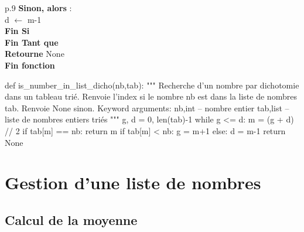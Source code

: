 \documentclass[10pt]{article}
\begin{document}
\begin{minipage}[c]{.48\linewidth}
\begin{pseudo}
\begin{center}
\begin{tabular}{p{.9\textwidth}}
\hspace{1.2cm}\textbf{Sinon, alors} :\\
\hspace{1.6cm}\textsf{d} $\leftarrow$ \textsf{m-1}\\
\hspace{.8cm} \textbf{Fin Si} \\
\hspace{.4cm}\textbf{Fin Tant que} \\
\hspace{.4cm}\textbf{Retourne} \textsf{None} \\
\textbf{Fin fonction} \\
\hline
\end{tabular}
\end{center}
\end{pseudo}
\end{minipage} \hfill
\begin{minipage}[c]{.48\linewidth}
\begin{py}
\begin{python}
def is_number_in_list_dicho(nb,tab):
    """ 
    Recherche d'un nombre par dichotomie dans un 
    tableau trié. 
    Renvoie l'index si le nombre nb est dans la liste 
    de nombres tab.
    Renvoie None sinon.
    Keyword arguments:
    nb,int -- nombre entier
    tab,list -- liste de nombres entiers triés
    """
    g, d = 0, len(tab)-1
    while g <= d:
        m = (g + d) // 2
        if tab[m] == nb:
            return m
        if tab[m] < nb:
            g = m+1
        else:
            d = m-1
    return None
\end{python}
\end{py}
\end{minipage}

\section{Gestion d'une liste de nombres}
\subsection{Calcul de la moyenne}
\end{document}
